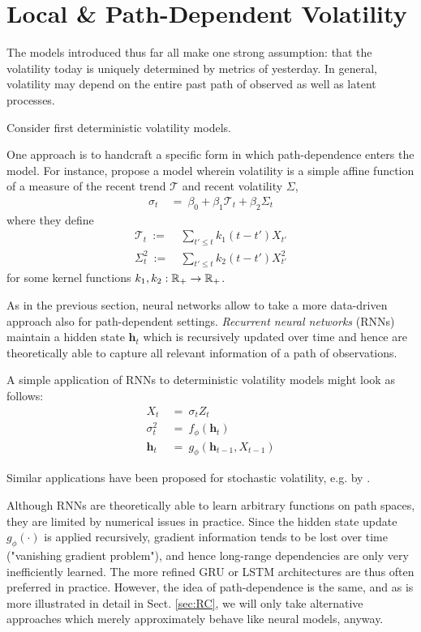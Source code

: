 \section{Local \& Path-Dependent Volatility}

The models introduced thus far all make one strong assumption: that the volatility today is uniquely determined by metrics of yesterday. In general, volatility may depend on the entire past path of observed as well as latent processes.

Consider first deterministic volatility models.

One approach is to handcraft a specific form in which path-dependence enters the model. For instance, \cite{Guyon22} propose a model wherein volatility is a simple affine function of a measure of the recent trend $\mathcal{T}$ and recent volatility $\Sigma$,
\begin{align*}
\sigma_t ~ &= ~ \beta_0 + \beta_1 \mathcal{T}_t + \beta_2 \Sigma_t
\end{align*}
where they define
\begin{align*}
\mathcal{T}_t ~ :=& ~ \sum_{t' \leq t} k_1(t-t') X_{t'} \\
\Sigma_t^2 ~ :=& ~ \sum_{t' \leq t} k_2(t-t') X_{t'}^2
\end{align*}
for some kernel functions $k_1, k_2: \mathbb{R}_+ \to \mathbb{R}_+$.

As in the previous section, neural networks allow to take a more data-driven approach also for path-dependent settings. \emph{Recurrent neural networks} (RNNs) maintain a hidden state $\pmb{h}_t$ which is recursively updated over time and hence are theoretically able to capture all relevant information of a path of observations.

A simple application of RNNs to deterministic volatility models might look as follows:
\begin{align*}
X_t ~ &= ~ \sigma_t Z_t \\
\sigma_t^2 ~ &= ~ f_\phi(\pmb{h}_t) \\
\pmb{h}_t ~ &= ~ g_\phi(\pmb{h}_{t-1}, X_{t-1})
\end{align*}

Similar applications have been proposed for stochastic volatility, e.g. by \citet{Luo18}.

Although RNNs are theoretically able to learn arbitrary functions on path spaces, they are limited by numerical issues in practice. Since the hidden state update $g_\phi(\cdot)$ is applied recursively, gradient information tends to be lost over time ("vanishing gradient problem"), and hence long-range dependencies are only very inefficiently learned. The more refined GRU or LSTM architectures are thus often preferred in practice. However, the idea of path-dependence is the same, and as is more illustrated in detail in Sect. \ref{sec:RC}, we will only take alternative approaches which merely approximately behave like neural models, anyway.

